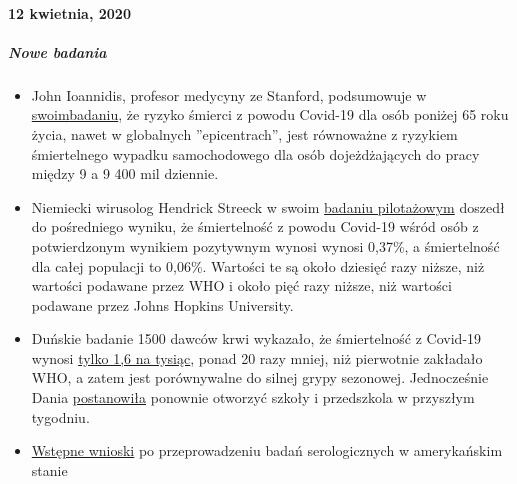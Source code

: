 \hypertarget{12-kwietnia-2020}{%
\paragraph{12 kwietnia, 2020}\label{12-kwietnia-2020}}

\hypertarget{nowe-badania}{%
\subparagraph{\texorpdfstring{\textbf{Nowe
badania}}{Nowe badania}}\label{nowe-badania}}

\begin{itemize}
\tightlist
\item
  John Ioannidis, profesor medycyny ze Stanford, podsumowuje w
  \href{https://www.medrxiv.org/content/10.1101/2020.04.05.20054361v1}{swoim}\href{https://www.medrxiv.org/content/10.1101/2020.04.05.20054361v1}{badaniu},
  że ryzyko śmierci z powodu Covid-19 dla osób poniżej 65 roku życia,
  nawet w globalnych ''epicentrach'', jest równoważne z ryzykiem
  śmiertelnego wypadku samochodowego dla osób dojeżdżających do pracy
  między 9 a 9 400 mil dziennie.
\item
  Niemiecki wirusolog Hendrick Streeck w swoim
  \href{https://www.t-online.de/gesundheit/krankheiten-symptome/id_87680236/lockerung-der-corona-massnahmen-ergebnisse-der-heinsberg-studie-machen-hoffnung.html}{badaniu
  pilotażowym} doszedł do pośredniego wyniku, że śmiertelność z powodu
  Covid-19 wśród osób z potwierdzonym wynikiem pozytywnym wynosi wynosi
  0,37\%, a śmiertelność dla całej populacji to 0,06\%. Wartości te są
  około dziesięć razy niższe, niż wartości podawane przez WHO i około
  pięć razy niższe, niż wartości podawane przez Johns Hopkins
  University.
\item
  Duńskie badanie 1500 dawców krwi wykazało, że śmiertelność z Covid-19
  wynosi
  \href{https://www.dr.dk/nyheder/indland/doedelighed-skal-formentlig-taelles-i-promiller-danske-blodproever-kaster-nyt-lys}{tylko
  1,6 na tysiąc}, ponad 20 razy mniej, niż pierwotnie zakładało WHO, a
  zatem jest porównywalne do silnej grypy sezonowej. Jednocześnie Dania
  \href{https://www.thelocal.dk/20200406/denmark-to-reopen-schools-and-kindergartens-next-week}{postanowiła}
  ponownie otworzyć szkoły i przedszkola w przyszłym tygodniu.
\item
  \href{https://reason.com/2020/04/08/mass-antibody-testing-in-this-rural-colorado-county-sheds-light-on-covid-19s-prevalence-and-lethality/}{W}\href{https://reason.com/2020/04/08/mass-antibody-testing-in-this-rural-colorado-county-sheds-light-on-covid-19s-prevalence-and-lethality/}{stępne
  wnioski} po przeprowadzeniu badań serologicznych w amerykańskim stanie

\end{itemize}
